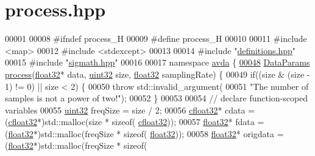 \hypertarget{process_8hpp_source}{\section{process.\+hpp}
\label{process_8hpp_source}
}

\begin{DoxyCode}
00001 
00008 \textcolor{preprocessor}{#ifndef process\_H}
00009 \textcolor{preprocessor}{#define process\_H}
00010 
00011 \textcolor{preprocessor}{#include <map>}
00012 \textcolor{preprocessor}{#include <stdexcept>}
00013 
00014 \textcolor{preprocessor}{#include "\hyperlink{definitions_8hpp}{definitions.hpp}"}
00015 \textcolor{preprocessor}{#include "\hyperlink{sigmath_8hpp}{sigmath.hpp}"}
00016 
00017 \textcolor{keyword}{namespace }\hyperlink{namespaceavda}{avda} \{    
\hypertarget{process_8hpp_source_l00048}{}\hyperlink{namespaceavda_a5196cce27286d08ca144a460caee7839}{00048}     \hyperlink{structDataParams}{DataParams} \hyperlink{namespaceavda_a5196cce27286d08ca144a460caee7839}{process}(\hyperlink{definitions_8hpp_aacdc525d6f7bddb3ae95d5c311bd06a1}{float32}* data, \hyperlink{definitions_8hpp_a1134b580f8da4de94ca6b1de4d37975e}{uint32} size, 
      \hyperlink{definitions_8hpp_aacdc525d6f7bddb3ae95d5c311bd06a1}{float32} samplingRate) \{
00049         \textcolor{keywordflow}{if}((size & (size - 1) != 0) || size < 2) \{
00050             \textcolor{keywordflow}{throw} std::invalid\_argument(
00051                     \textcolor{stringliteral}{"The number of samples is not a power of two!"});
00052         \}
00053 
00054         \textcolor{comment}{// declare function-scoped variables}
00055         \hyperlink{definitions_8hpp_a1134b580f8da4de94ca6b1de4d37975e}{uint32} freqSize = size / 2;
00056         \hyperlink{definitions_8hpp_a960be6b6614c08090c16574dba10a421}{cfloat32}* cdata = (\hyperlink{definitions_8hpp_a960be6b6614c08090c16574dba10a421}{cfloat32}*)std::malloc(size * \textcolor{keyword}{sizeof}(
      \hyperlink{definitions_8hpp_a960be6b6614c08090c16574dba10a421}{cfloat32}));
00057         \hyperlink{definitions_8hpp_aacdc525d6f7bddb3ae95d5c311bd06a1}{float32}* fdata = (\hyperlink{definitions_8hpp_aacdc525d6f7bddb3ae95d5c311bd06a1}{float32}*)std::malloc(freqSize * \textcolor{keyword}{sizeof}(
      \hyperlink{definitions_8hpp_aacdc525d6f7bddb3ae95d5c311bd06a1}{float32}));
00058         \hyperlink{definitions_8hpp_aacdc525d6f7bddb3ae95d5c311bd06a1}{float32}* origdata = (\hyperlink{definitions_8hpp_aacdc525d6f7bddb3ae95d5c311bd06a1}{float32}*)std::malloc(freqSize * \textcolor{keyword}{sizeof}(

\end{DoxyCode}
